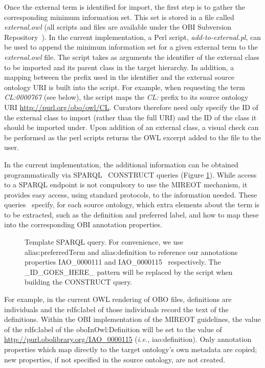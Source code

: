 \documentclass[jou]{ao2e}%
\begin{document}
Once the external term is identified for import, the first step is to gather the corresponding minimum information set.
This set is stored in a file called \emph{external.owl} (all scripts and files are available under the \ac{OBI} Subversion Repository~\citep{OBIScripts}).
In the current implementation, a Perl script, \emph{add-to-external.pl}, can be used to append the minimum information set for a given external term to the \emph{external.owl} file.
The script takes as arguments the identifier of the external class to be imported and its parent class in the target hierarchy.
In addition, a mapping between the prefix used in the identifier and the external source ontology \ac{URI} is built into the script. For example, when requesting the term \textit{CL:0000767} (see below), the script maps the \textit{CL:} prefix to its source ontology \ac{URI} \url{http://purl.org/obo/owl/CL}.
Curators therefore need only specify the ID of the external class to import (rather than the full URI) and the ID of the class it should be imported under.
Upon addition of an external class, a visual check can be performed as the perl scripts returns the \ac{OWL} excerpt added to the file to the user.

In the current implementation, the additional information can be obtained programmatically via SPARQL~\citep{SPARQL} CONSTRUCT queries (Figure \ref{fig:sparql}). While access to a SPARQL endpoint is not compulsory to use the MIREOT mechanism, it provides easy access, using standard protocols, to the information needed.
These queries~\citep{OBIQueries} specify, for each source ontology, which extra elements about the term is to be extracted, such as the definition and preferred label, and how to map these into the corresponding OBI annotation properties. 


\begin{figure}[t]
\scriptsize
 
\caption{Template SPARQL query. For convenience, we use alias:preferredTerm and
alias:definition to reference our annotations properties IAO\_0000111 and IAO\_0000115~\citep{IAO} respectively. The \_ID\_GOES\_HERE\_ pattern will be replaced by the script when building the CONSTRUCT query.}
\label{fig:sparql}
\end{figure}

For example, in the current \ac{OWL} rendering of \ac{OBO} files, definitions are individuals and the rdfs:label of those individuals record the text of the definitions. 
Within the \ac{OBI} implementation of the \ac{MIREOT} guidelines, the value of the rdfs:label of the oboInOwl:Definition will be set to the value of \url{http://purl.obolibrary.org/IAO_0000115} (\emph{i.e.,} iao:definition). Only annotation properties which map directly to the target ontology's own metadata are copied; new properties, if not specified in the source ontology, are not created. 
\end{document}

